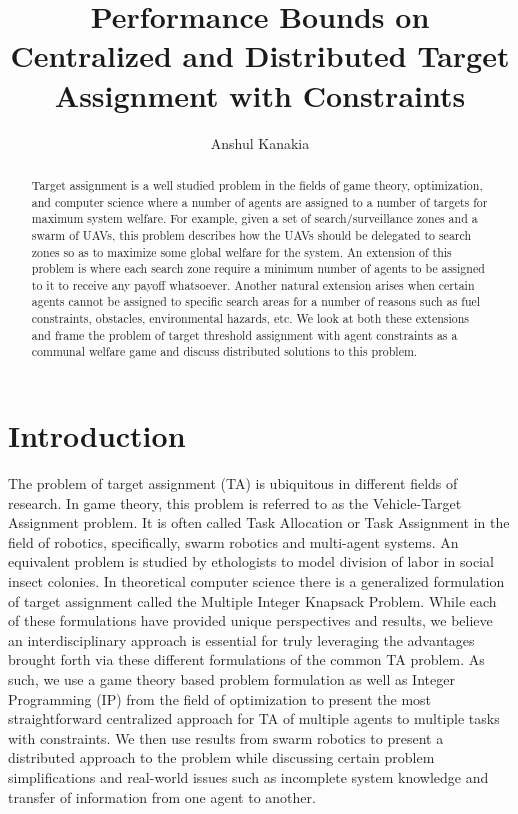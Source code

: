 \documentclass[11pt, onecolumn, compsoc, letterpaper]{article}
\title{Performance Bounds on Centralized and Distributed Target Assignment with Constraints}
\author{Anshul Kanakia}
\date{}
\begin{document}
\maketitle

\begin{abstract}
Target assignment is a well studied problem in the fields of game theory, optimization, and computer science where a number of agents are assigned to a number of targets for maximum system welfare. For example, given a set of search/surveillance zones and a swarm of UAVs, this problem describes how the UAVs should be delegated to search zones so as to maximize some global welfare for the system. An extension of this problem is where each search zone require a minimum number of agents to be assigned to it to receive any payoff whatsoever. Another natural extension arises when certain agents cannot be assigned to specific search areas for a number of reasons such as fuel constraints, obstacles, environmental hazards, etc. We look at both these extensions and frame the problem of target threshold assignment with agent constraints as a communal welfare game and discuss distributed solutions to this problem.
\end{abstract}

\section{Introduction}
The problem of target assignment (TA) is ubiquitous in different fields of research. In game theory, this problem is referred to as the Vehicle-Target Assignment problem. It is often called Task Allocation or Task Assignment in the field of robotics, specifically, swarm robotics and multi-agent systems. An equivalent problem is studied by ethologists to model division of labor in social insect colonies. In theoretical computer science there is a generalized formulation of target assignment called the Multiple Integer Knapsack Problem. While each of these formulations have provided unique perspectives and results, we believe an interdisciplinary approach is essential for truly leveraging the advantages brought forth via these different formulations of the common TA problem. As such, we use a game theory based problem formulation as well as Integer Programming (IP) from the field of optimization to present the most straightforward centralized approach for TA of multiple agents to multiple tasks with constraints. We then use results from swarm robotics to present a distributed approach to the problem while discussing certain problem simplifications and real-world issues such as incomplete system knowledge and transfer of information from one agent to another.
\end{document}
